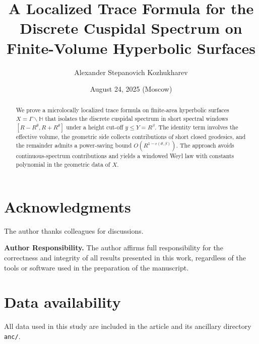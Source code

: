 \documentclass[12pt]{amsart}
\title[Localized Trace Formula]{A Localized Trace Formula for the Discrete Cuspidal Spectrum on Finite-Volume Hyperbolic Surfaces}
\author{Alexander Stepanovich Kozhukharev}
\date{August 24, 2025 (Moscow)}
\numberwithin{equation}{section}
\theoremstyle{plain}
\theoremstyle{definition}
\theoremstyle{remark}
\newcommand{\HH}{\mathbb{H}}
\begin{document}
\begin{abstract}
We prove a microlocally localized trace formula on finite-area hyperbolic surfaces $X=\Gamma\backslash\HH$ that isolates the discrete cuspidal spectrum in short spectral windows $[R-R^\theta,R+R^\theta]$ under a height cut-off $y\le Y=R^\beta$. The identity term involves the effective volume, the geometric side collects contributions of short closed geodesics, and the remainder admits a power-saving bound $O(R^{1-\varepsilon(\theta,\beta)})$. The approach avoids continuous-spectrum contributions and yields a windowed Weyl law with constants polynomial in the geometric data of $X$.
\end{abstract}

\maketitle
\tableofcontents










\section*{Acknowledgments}
The author thanks colleagues for discussions.

\bigskip
\noindent\textbf{Author Responsibility.}
The author affirms full responsibility for the correctness and integrity of all results presented in this work, regardless of the tools or software used in the preparation of the manuscript.

\section*{Data availability}
All data used in this study are included in the article and its ancillary directory \texttt{anc/}.

\appendix



\nocite{*}


\end{document}
